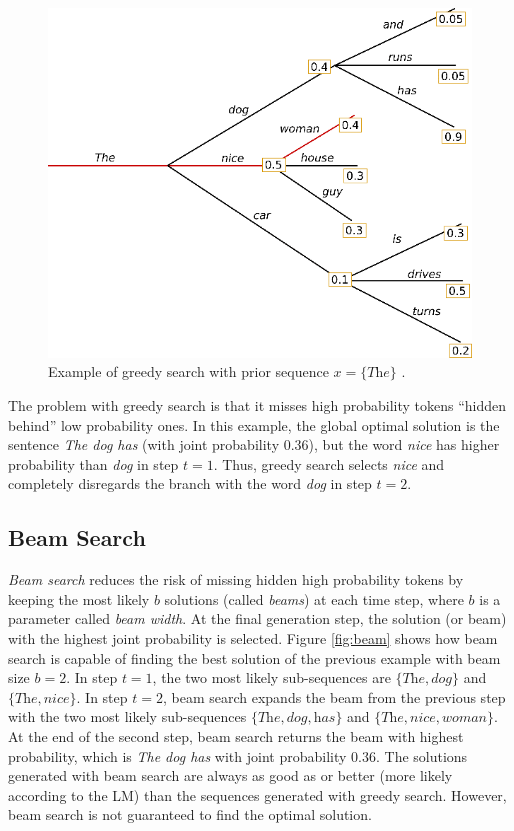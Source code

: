\begin{figure}[!h]
 \centering
 \includegraphics[width=0.7\columnwidth]{imgs/background/greedy.png}
 \caption{Example of greedy search with prior sequence $x = \{\textit{The}\}$ \cite{platen2020}.}
 \label{fig:greedy}
\end{figure}

The problem with greedy search is that it misses high probability tokens ``hidden behind'' low probability ones. In this example, the global optimal solution is the sentence \textit{The dog has} (with joint probability $0.36$), but the word \textit{nice} has higher probability than \textit{dog} in step $t=1$. Thus, greedy search selects \textit{nice} and completely disregards the branch with the word \textit{dog} in step $t=2$.

\subsection{Beam Search}

\textit{Beam search} reduces the risk of missing hidden high probability tokens by keeping the most likely $b$ solutions (called \textit{beams}) at each time step, where $b$ is a parameter called \textit{beam width}. At the final generation step, the solution (or beam) with the highest joint probability is selected. Figure \ref{fig:beam} shows how beam search is capable of finding the best solution of the previous example with beam size $b=2$. In step $t=1$, the two most likely sub-sequences are $\{ \textit{The}, \textit{dog} \}$ and $\{ \textit{The}, \textit{nice} \}$. In step $t=2$, beam search expands the beam from the previous step with the two most likely sub-sequences $\{ \textit{The}, \textit{dog}, \textit{has} \}$ and $\{ \textit{The}, \textit{nice}, \textit{woman} \}$. At the end of the second step, beam search returns the beam with highest probability, which is \textit{The dog has} with joint probability $0.36$. The solutions generated with beam search are always as good as or better (more likely according to the LM) than the sequences generated with greedy search. However, beam search is not guaranteed to find the optimal solution.

